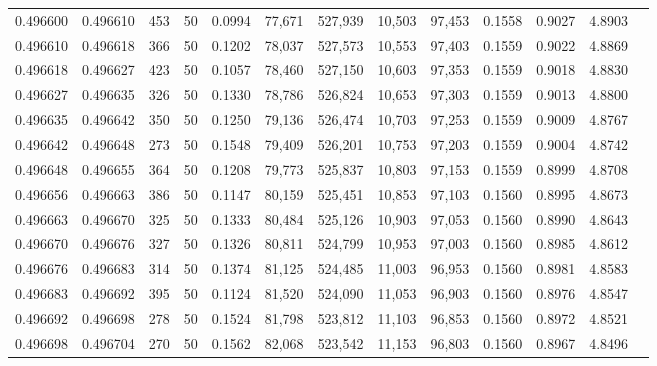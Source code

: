 \begin{tabular}{rrrrrrrrrrrrr}
0.496600 & 0.496610 & 453 &  50 &                                     0.0994 &  77,671 & 527,939 &  10,503 &  97,453 & 0.1558 & 0.9027 & 4.8903 \\
0.496610 & 0.496618 & 366 &  50 &                                     0.1202 &  78,037 & 527,573 &  10,553 &  97,403 & 0.1559 & 0.9022 & 4.8869 \\
0.496618 & 0.496627 & 423 &  50 &                                     0.1057 &  78,460 & 527,150 &  10,603 &  97,353 & 0.1559 & 0.9018 & 4.8830 \\
0.496627 & 0.496635 & 326 &  50 &                                     0.1330 &  78,786 & 526,824 &  10,653 &  97,303 & 0.1559 & 0.9013 & 4.8800 \\
0.496635 & 0.496642 & 350 &  50 &                                     0.1250 &  79,136 & 526,474 &  10,703 &  97,253 & 0.1559 & 0.9009 & 4.8767 \\
0.496642 & 0.496648 & 273 &  50 &                                     0.1548 &  79,409 & 526,201 &  10,753 &  97,203 & 0.1559 & 0.9004 & 4.8742 \\
0.496648 & 0.496655 & 364 &  50 &                                     0.1208 &  79,773 & 525,837 &  10,803 &  97,153 & 0.1559 & 0.8999 & 4.8708 \\
0.496656 & 0.496663 & 386 &  50 &                                     0.1147 &  80,159 & 525,451 &  10,853 &  97,103 & 0.1560 & 0.8995 & 4.8673 \\
0.496663 & 0.496670 & 325 &  50 &                                     0.1333 &  80,484 & 525,126 &  10,903 &  97,053 & 0.1560 & 0.8990 & 4.8643 \\
0.496670 & 0.496676 & 327 &  50 &                                     0.1326 &  80,811 & 524,799 &  10,953 &  97,003 & 0.1560 & 0.8985 & 4.8612 \\
0.496676 & 0.496683 & 314 &  50 &                                     0.1374 &  81,125 & 524,485 &  11,003 &  96,953 & 0.1560 & 0.8981 & 4.8583 \\
0.496683 & 0.496692 & 395 &  50 &                                     0.1124 &  81,520 & 524,090 &  11,053 &  96,903 & 0.1560 & 0.8976 & 4.8547 \\
0.496692 & 0.496698 & 278 &  50 &                                     0.1524 &  81,798 & 523,812 &  11,103 &  96,853 & 0.1560 & 0.8972 & 4.8521 \\
0.496698 & 0.496704 & 270 &  50 &                                     0.1562 &  82,068 & 523,542 &  11,153 &  96,803 & 0.1560 & 0.8967 & 4.8496 \\

\end{tabular}

